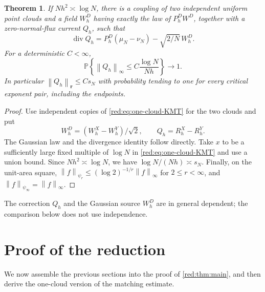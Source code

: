 \documentclass[11pt]{article}
\newtheorem{theorem}{Theorem}[section]
\theoremstyle{definition}
\theoremstyle{remark}
\numberwithin{equation}{section}
\newcommand{\Pp}{\mathbb P}
\newcommand{\divv}{\operatorname{div}}
\newcommand{\norm}[1]{\left\|#1\right\|}
\begin{document}
\begin{theorem}\label{red:thm:KMT}
If $Nh^2\asymp\log N$, there is a coupling of two independent
uniform point clouds and a field $W_h^D$ having exactly the law
of $P_h^DW^D$, together with a zero-normal-flux current $Q_h$, such that
\begin{equation}\label{red:eq:KMT-div}
 \divv Q_h=P_h^D(\mu_N-\nu_N)-\sqrt{2/N}\,W_h^D.
\end{equation}
For a deterministic $C<\infty$,
\begin{equation}\label{red:eq:KMT-infty}
 \Pp\!\left\{\norm{Q_h}_\infty\le
 C\frac{\log N}{Nh}\right\}\longrightarrow1.
\end{equation}
In particular $\norm{Q_h}_{\boldsymbol r}\le Cs_N$ with probability
tending to one for every critical exponent pair, including the endpoints.
\end{theorem}

\begin{proof}
Use independent copies of \eqref{red:eq:one-cloud-KMT} for the two
clouds and put
\[
 W_h^D=(W_h^X-W_h^Y)/\sqrt2,
 \qquad Q_h=R_h^X-R_h^Y.
\]
The Gaussian law and the divergence identity follow directly.
Take $x$ to be a sufficiently large fixed multiple of $\log N$
in \eqref{red:eq:one-cloud-KMT} and use a union bound.
Since $Nh^2\asymp\log N$, we have $\log N/(Nh)\asymp s_N$.
Finally, on the unit-area square,
$\norm f_{\psi_r}\le(\log2)^{-1/r}\norm f_\infty$
for $2\le r<\infty$, and $\norm f_{\psi_\infty}=\norm f_\infty$.
\end{proof}
The correction $Q_h$ and the Gaussian source $W_h^D$ are in general
dependent; the comparison below does not use independence.


\section{Proof of the reduction}\label{sec:probability-transfer}

We now assemble the previous sections into the proof of
\cref{red:thm:main}, and then derive the one-cloud version of the
matching estimate.
\end{document}
